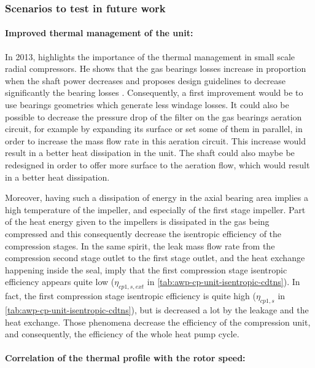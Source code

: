 \subsubsection{Scenarios to test in future work}
\label{sec:awp-laby-seal-hot-gas-next}

\paragraph{Improved thermal management of the unit:}

In 2013, \citet[p.\,1--2]{schiffmann-2013a} highlights the importance
of the thermal management in small scale radial compressors. He shows
that the gas bearings losses increase in proportion when the shaft
power decreases \citep[p.\,1 \& fig.\,1 p.\,2]{schiffmann-2013a} and
proposes design guidelines to decrease significantly the bearing
losses \citep[tab. 4 p.\,6]{schiffmann-2013a}. Consequently, a first
improvement would be to use bearings geometries which generate less
windage losses. It could also be possible to decrease the pressure
drop of the filter on the gas bearings aeration circuit, for example
by expanding its surface or set some of them in parallel, in order to
increase the mass flow rate in this aeration circuit. This increase
would result in a better heat dissipation in the unit. The shaft could
also maybe be redesigned in order to offer more surface to the
aeration flow, which would result in a better heat dissipation.

Moreover, having such a dissipation of energy in the axial bearing
area implies a high temperature of the impeller, and especially of the
first stage impeller. Part of the heat energy given to the impellers
is dissipated in the gas being compressed and this consequently
decrease the isentropic efficiency of the compression stages. In the
same spirit, the leak mass flow rate from the compression second stage
outlet to the first stage outlet, and the heat exchange happening
inside the seal, imply that the first compression stage isentropic
efficiency appears quite low ($\eta_{cp1,s,ext}$ in
\cref{tab:awp-cp-unit-isentropic-cdtns}). In fact, the first
compression stage isentropic efficiency is quite high ($\eta_{cp1,s}$
in \cref{tab:awp-cp-unit-isentropic-cdtns}), but is decreased a lot by
the leakage and the heat exchange. Those phenomena decrease the
efficiency of the compression unit, and consequently, the efficiency
of the whole heat pump cycle.

\paragraph{Correlation of the thermal profile with the rotor speed:}


